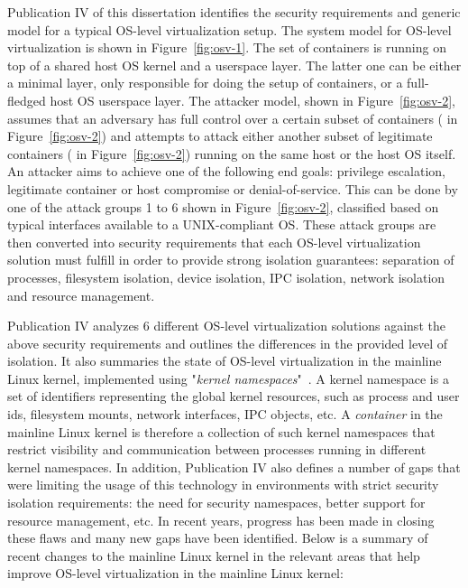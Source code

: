 Publication IV of this dissertation identifies the security requirements and generic model for a typical OS-level virtualization setup.
The system model for OS-level virtualization is shown in Figure~\ref{fig:osv-1}. The set of containers  is running on top of a shared host OS kernel and a userspace layer. The latter one can be either a minimal layer, only responsible for doing the setup of containers, or a full-fledged host OS userspace layer. The attacker model, shown in Figure~\ref{fig:osv-2}, assumes that an adversary has full control over a certain subset of containers ( in Figure~\ref{fig:osv-2}) and attempts to attack either another subset of legitimate containers ( in Figure~\ref{fig:osv-2}) running on the same host or the host OS itself. An attacker aims to achieve one of the following end goals: privilege escalation, legitimate container or host compromise or denial-of-service. This can be done by one of the attack groups 1 to 6 shown in Figure~\ref{fig:osv-2}, classified based on typical interfaces available to a UNIX-compliant OS. These attack groups are then converted into security requirements that each OS-level virtualization solution must fulfill in order to provide strong isolation guarantees: separation of processes, filesystem isolation, device isolation, IPC isolation, network isolation and resource management.   

Publication IV analyzes 6 different OS-level virtualization solutions against the above security requirements and outlines the differences in the provided level of isolation. It also summaries the state of OS-level virtualization in the mainline Linux kernel, implemented using "\textit{kernel namespaces}"~\cite{biederman2006}. A kernel namespace is a set of identifiers representing the global kernel resources, such as process and user ids, filesystem mounts, network interfaces, IPC objects, etc. A \textit{container} in the mainline Linux kernel is therefore a collection of such kernel namespaces that restrict visibility and communication between processes running in different kernel namespaces. In addition, Publication IV also defines a number of gaps that were limiting the usage of this technology in environments with strict security isolation requirements: the need for security namespaces, better support for resource management, etc. In recent years, progress has been made in closing these flaws and many new gaps have been identified. Below is a summary of recent changes to the mainline Linux kernel in the relevant areas that help improve OS-level virtualization in the mainline Linux kernel:  

